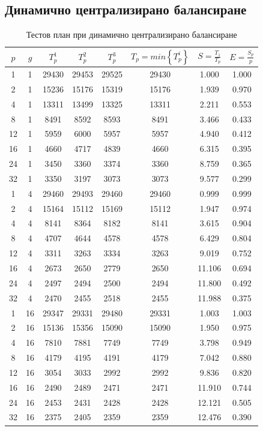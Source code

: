 \documentclass[a4paper,11pt]{article}
\begin{document}
\subsection{Динамично централизирано балансиране}
\begin{table}[H]
    \centering
    \begin{tabular}{|c|c|c|c|c|c|c|c|}
    \hline
        $p$ & $g$ & $T_p^1$ & $T_p^2$ & $T_p^3$ & $T_p=min\left\{T_p^{i}\right\}$ & $S = \frac{T_1}{T_p}$ & $E=\frac{S_p}{p}$\\ \hline
        1 & 1 & 29430 & 29453 & 29525 & 29430 & 1.000 & 1.000 \\ \hline
        2 & 1 & 15236 & 15176 & 15319 & 15176 & 1.939 & 0.970 \\ \hline
        4 & 1 & 13311 & 13499 & 13325 & 13311 & 2.211 & 0.553 \\ \hline
        8 & 1 & 8491 & 8592 & 8593 & 8491 & 3.466 & 0.433 \\ \hline
        12 & 1 & 5959 & 6000 & 5957 & 5957 & 4.940 & 0.412 \\ \hline
        16 & 1 & 4660 & 4717 & 4839 & 4660 & 6.315 & 0.395 \\ \hline
        24 & 1 & 3450 & 3360 & 3374 & 3360 & 8.759 & 0.365 \\ \hline
        32 & 1 & 3350 & 3197 & 3073 & 3073 & 9.577 & 0.299 \\ \hline
        1 & 4 & 29460 & 29493 & 29460 & 29460 & 0.999 & 0.999 \\ \hline
        2 & 4 & 15164 & 15112 & 15169 & 15112 & 1.947 & 0.974 \\ \hline
        4 & 4 & 8141 & 8364 & 8182 & 8141 & 3.615 & 0.904 \\ \hline
        8 & 4 & 4707 & 4644 & 4578 & 4578 & 6.429 & 0.804 \\ \hline
        12 & 4 & 3311 & 3263 & 3334 & 3263 & 9.019 & 0.752 \\ \hline
        16 & 4 & 2673 & 2650 & 2779 & 2650 & 11.106 & 0.694 \\ \hline
        24 & 4 & 2497 & 2494 & 2500 & 2494 & 11.800 & 0.492 \\ \hline
        32 & 4 & 2470 & 2455 & 2518 & 2455 & 11.988 & 0.375 \\ \hline
        1 & 16 & 29347 & 29331 & 29480 & 29331 & 1.003 & 1.003 \\ \hline
        2 & 16 & 15136 & 15356 & 15090 & 15090 & 1.950 & 0.975 \\ \hline
        4 & 16 & 7810 & 7881 & 7749 & 7749 & 3.798 & 0.949 \\ \hline
        8 & 16 & 4179 & 4195 & 4191 & 4179 & 7.042 & 0.880 \\ \hline
        12 & 16 & 3054 & 3033 & 2992 & 2992 & 9.836 & 0.820 \\ \hline
        16 & 16 & 2490 & 2489 & 2471 & 2471 & 11.910 & 0.744 \\ \hline
        24 & 16 & 2453 & 2431 & 2428 & 2428 & 12.121 & 0.505 \\ \hline
        32 & 16 & 2375 & 2405 & 2359 & 2359 & 12.476 & 0.390 \\ \hline
    \end{tabular}
    \caption{Тестов план при динамично централизирано балансиране}
\end{table}
\end{document}
